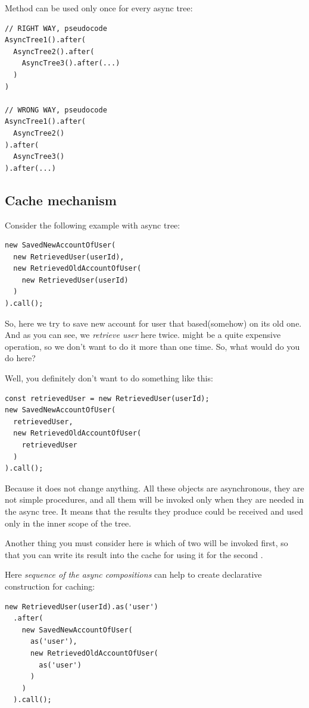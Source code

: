 \documentclass{article}
\newcommand{\cit}[1]{{\fontfamily{qcr}\selectfont{\textcolor{superdarkgray}{#1}}}}
\begin{document}
Method \cit{after} can be used only once for every async tree:

\begin{lstlisting}
// RIGHT WAY, pseudocode
AsyncTree1().after(
  AsyncTree2().after(
    AsyncTree3().after(...)
  )
)

// WRONG WAY, pseudocode
AsyncTree1().after(
  AsyncTree2()
).after(
  AsyncTree3()
).after(...)
\end{lstlisting}

\subsection{Cache mechanism}

Consider the following example with async tree:

\begin{lstlisting}
new SavedNewAccountOfUser(
  new RetrievedUser(userId),
  new RetrievedOldAccountOfUser(
    new RetrievedUser(userId)
  )
).call();
\end{lstlisting}

So, here we try to save new account for user that based(somehow) on its old one. And as you can see, we \textit{retrieve user} here twice. \cit{RetrievedUser} might be a quite expensive operation, so we don't want to do it more than one time. So, what would do you do here?

Well, you definitely don't want to do something like this:

\begin{lstlisting}
const retrievedUser = new RetrievedUser(userId);
new SavedNewAccountOfUser(
  retrievedUser,
  new RetrievedOldAccountOfUser(
    retrievedUser
  )
).call();
\end{lstlisting}

Because it does not change anything. All these objects are asynchronous, they are not simple procedures, and all them will be invoked only when they are needed in the async tree. It means that the results they produce could be received and used only in the inner scope of the tree.

Another thing you must consider here is which of two \cit{RetrievedUser} will be invoked first, so that you can write its result into the cache for using it for the second \cit{RetrievedUser}.

Here \textit{sequence of the async compositions} can help to create declarative construction for caching:

\begin{lstlisting}
new RetrievedUser(userId).as('user')
  .after(
    new SavedNewAccountOfUser(
      as('user'),
      new RetrievedOldAccountOfUser(
        as('user')
      )
    )
  ).call();
\end{lstlisting}
\end{document}
